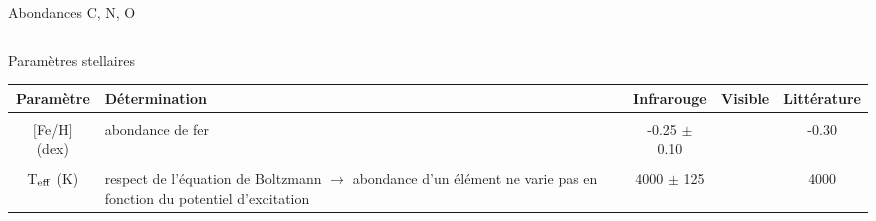 \documentclass[10pt]{beamer}
\begin{document}
\begin{frame}[fragile]{Abondances C, N, O}
\begin{columns}
\begin{column}{0.7\textwidth}
        \end{column}
    \end{columns}
\end{frame}

\begin{frame}[fragile]{Paramètres stellaires}
\begin{table}[h!]
    \begin{center}
        \begin{tabularx}{\textwidth}{c|X|c|c|c}
            Paramètre & Détermination & Infrarouge &Visible& Littérature \\
            \hline
            &&&\\
            $[$Fe/H$]$ (dex)&  abondance de fer & -0.25 $\pm$ 0.10 & &-0.30 \\
            &&&\\
            T$_{\rm eff}$ (K) & respect de l'équation de Boltzmann $\rightarrow$  abondance d'un élément ne varie pas en fonction du potentiel d'excitation & 4000 $\pm$ 125   && 4000 \\
        \end{tabularx}
    \end{center}
\end{table}

\end{frame}
\end{document}
